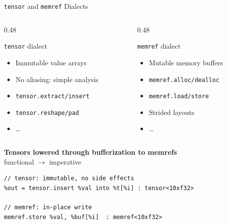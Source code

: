 \begin{frame}[fragile]{\texttt{tensor} and \texttt{memref} Dialects}
  \begin{columns}
    \begin{column}{0.48\textwidth}
      \begin{block}{\texttt{tensor} dialect}
        {\small
        \begin{itemize}
          \item Immutable value arrays
          \item No aliasing: simple analysis
          \item \texttt{tensor.extract/insert}
          \item \texttt{tensor.reshape/pad}
          \item \ldots
        \end{itemize}
        }
      \end{block}
    \end{column}
    \begin{column}{0.48\textwidth}
      \begin{exampleblock}{\texttt{memref} dialect}
        {\small
        \begin{itemize}
          \item Mutable memory buffers
          \item \texttt{memref.alloc/dealloc}
          \item \texttt{memref.load/store}
          \item Strided layouts
          \item \ldots
        \end{itemize}
        }
      \end{exampleblock}
    \end{column}
  \end{columns}

  \bigskip
  \textbf{\textcolor{mainAccent}{%
    Tensors lowered through bufferization to memrefs}}\\
  \medskip
  functional $\rightarrow$ imperative

  \begin{lstlisting}[language=none,basicstyle=\ttfamily\small]
// tensor: immutable, no side effects
%out = tensor.insert %val into %t[%i] : tensor<10xf32>

// memref: in-place write
memref.store %val, %buf[%i]  : memref<10xf32>
\end{lstlisting}
\end{frame}


